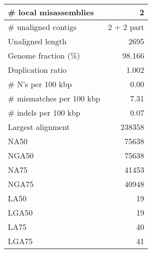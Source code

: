 \documentclass[12pt,a4paper]{article}
\begin{document}
\begin{table}[ht]
\begin{center}
\begin{tabular}{|l*{1}{|r}|}
\# local misassemblies & 2 \\ \hline
\# unaligned contigs & 2 + 2 part \\ \hline
Unaligned length & 2695 \\ \hline
Genome fraction (\%) & 98.166 \\ \hline
Duplication ratio & 1.002 \\ \hline
\# N's per 100 kbp & 0.00 \\ \hline
\# mismatches per 100 kbp & 7.31 \\ \hline
\# indels per 100 kbp & 0.07 \\ \hline
Largest alignment & 238358 \\ \hline
NA50 & 75638 \\ \hline
NGA50 & 75638 \\ \hline
NA75 & 41453 \\ \hline
NGA75 & 40948 \\ \hline
LA50 & 19 \\ \hline
LGA50 & 19 \\ \hline
LA75 & 40 \\ \hline
LGA75 & 41 \\ \hline
\end{tabular}
\end{center}
\end{table}
\end{document}
